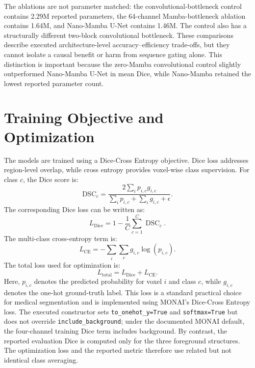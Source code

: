 The ablations are not parameter matched: the convolutional-bottleneck control contains 2.29M reported parameters, the 64-channel Mamba-bottleneck ablation contains 1.64M, and Nano-Mamba U-Net contains 1.46M. The control also has a structurally different two-block convolutional bottleneck. These comparisons describe executed architecture-level accuracy--efficiency trade-offs, but they cannot isolate a causal benefit or harm from sequence gating alone. This distinction is important because the zero-Mamba convolutional control slightly outperformed Nano-Mamba U-Net in mean Dice, while Nano-Mamba retained the lowest reported parameter count.

\section{Training Objective and Optimization}
The models are trained using a Dice-Cross Entropy objective. Dice loss addresses region-level overlap, while cross entropy provides voxel-wise class supervision. For class $c$, the Dice score is:
\begin{equation}
    \mathrm{DSC}_c=\frac{2\sum_i p_{i,c}g_{i,c}}{\sum_i p_{i,c}+\sum_i g_{i,c}+\epsilon}.
\end{equation}
The corresponding Dice loss can be written as:
\begin{equation}
    L_{\mathrm{Dice}}=1-\frac{1}{C}\sum_{c=1}^{C}\operatorname{DSC}_c.
\end{equation}
The multi-class cross-entropy term is:
\begin{equation}
    L_{\mathrm{CE}}=-\sum_i\sum_c g_{i,c}\log(p_{i,c}).
\end{equation}
The total loss used for optimization is:
\begin{equation}
    L_{\mathrm{total}}=L_{\mathrm{Dice}}+L_{\mathrm{CE}}.
\end{equation}
Here, $p_{i,c}$ denotes the predicted probability for voxel $i$ and class $c$, while $g_{i,c}$ denotes the one-hot ground-truth label. This loss is a standard practical choice for medical segmentation and is implemented using MONAI's Dice-Cross Entropy loss. The executed constructor sets \texttt{to\_onehot\_y=True} and \texttt{softmax=True} but does not override \texttt{include\_background}; under the documented MONAI default, the four-channel training Dice term includes background. By contrast, the reported evaluation Dice is computed only for the three foreground structures. The optimization loss and the reported metric therefore use related but not identical class averaging.

